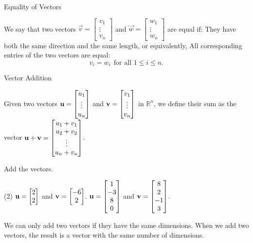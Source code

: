 \documentclass[xcolor=dvipsnames,aspectratio=169,t]{beamer}
\begin{document}
\begin{frame}{Equality of Vectors}
  
  \bbox
  We say that two vectors $\vec{v} = \begin{bmatrix} v_1 \\ \vdots \\ v_n \end{bmatrix}$ and $\vec{w}= \begin{bmatrix} w_1 \\ \vdots \\ w_n \end{bmatrix}$ are \alert{equal} if:
  \bi
  \ii  They have both the \alert{same direction and the same length}, or equivalently,
  \ii All corresponding entries of the two vectors are equal:
 \alert{  \[ v_i = w_i \ \ \mbox{for all } 1 \leq i \leq n.\] }
  \ei
  \ebox

 \end{frame}


\begin{frame}{Vector Addition}

  {\small
  Given two vectors $\mathbf{u} = \begin{bmatrix}u_1\\ \vdots \\ u_n \end{bmatrix}$ and $\mathbf{v} = \begin{bmatrix}v_1\\ \vdots \\ v_n \end{bmatrix}$ in $\mathbb{R}^n$, we define their sum as the vector $\mathbf{u} + \mathbf{v} = \begin{bmatrix} u_1 + v_1 \\ u_2 + v_2 \\ \vdots \\ u_n + v_n \end{bmatrix}$.}

  \pause
  \begin{example}
    Add the vectors.
    \begin{tasks}(2)
    \task $\mathbf{u} = \begin{bmatrix} 2 \\ 2 \end{bmatrix}$ and $\mathbf{v} = \begin{bmatrix} -6 \\ 2 \end{bmatrix}$. 
    \task $\mathbf{u} = \begin{bmatrix} 1 \\ -3 \\ 8 \\ 0  \end{bmatrix}$ and $\mathbf{v} = \begin{bmatrix} 8 \\ 2 \\ -1 \\ 3 \end{bmatrix}$.
    \end{tasks}
  \end{example}

  \vfill
     
  \pause
  \bi
    \ii We can only add two vectors if they have the same \alert{dimensions}.
    \ii When we add two vectors, the result is a vector with the same number of dimensions.
  \ei
\end{frame}
\end{document}
